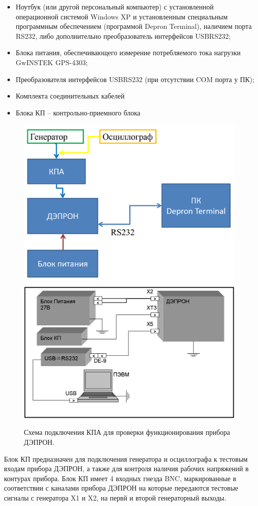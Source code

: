 \begin{itemize}
	\item 	Ноутбук (или другой персональный компьютер) с установленной операционной системой Windows XP и установленным специальным программным обеспечением (программой Depron Terminal), наличием порта RS232, либо дополнительно преобразователь интерфейсов USBRS232;
	
	
	\item 	Блока питания, обеспечивающего измерение потребляемого тока нагрузки GwINSTEK GPS-4303;
	
	
	\item 	Преобразователя интерфейсов USBRS232 (при отсутствии COM порта у ПК);
	
	
	\item 	Комплекта соединительных кабелей 
	
	
	\item 	Блока КП -- контрольно-приемного блока
	
	
\end{itemize}





\begin{figure}
	\centering
	\includegraphics[width=0.49\linewidth]{images/kalibr}
	\includegraphics[width=0.49\linewidth]{images/kalibr1}
	\caption[Схема подключения прибора при калибровке]{ Схема подключения КПА для проверки функционирования прибора ДЭПРОН.}
	\label{fig:kalibr}
\end{figure}



Блок КП предназначен для подключения генератора и осциллографа к тестовым входам прибора ДЭПРОН, а также для контроля наличия рабочих напряжений в контурах прибора. Блок КП имеет 4 входных гнезда BNC, маркированные в соответствии с каналами прибора ДЭПРОН на которые передаются тестовые сигналы с генератора X1 и	X2, на первй и второй генераторный выходы. 


